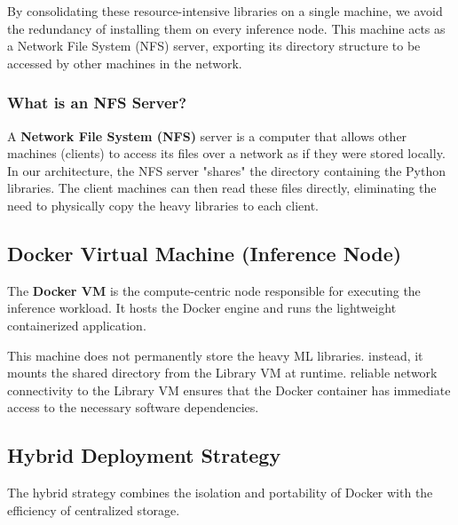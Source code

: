 \documentclass[11pt,a4paper]{article}
\begin{document}
By consolidating these resource-intensive libraries on a single machine, we avoid the redundancy of installing them on every inference node. This machine acts as a Network File System (NFS) server, exporting its directory structure to be accessed by other machines in the network.

\subsubsection{What is an NFS Server?}

A \textbf{Network File System (NFS)} server is a computer that allows other machines (clients) to access its files over a network as if they were stored locally. In our architecture, the NFS server "shares" the directory containing the Python libraries. The client machines can then read these files directly, eliminating the need to physically copy the heavy libraries to each client.

\subsection{Docker Virtual Machine (Inference Node)}

The \textbf{Docker VM} is the compute-centric node responsible for executing the inference workload. It hosts the Docker engine and runs the lightweight containerized application.

This machine does not permanently store the heavy ML libraries. instead, it mounts the shared directory from the Library VM at runtime. reliable network connectivity to the Library VM ensures that the Docker container has immediate access to the necessary software dependencies.

\subsection{Hybrid Deployment Strategy}

The hybrid strategy combines the isolation and portability of Docker with the efficiency of centralized storage.
\end{document}
